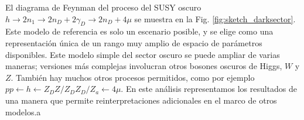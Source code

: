 El diagrama de Feynman del proceso del SUSY oscuro  $h \rightarrow 2n_1 \rightarrow 2n_D + 2\gamma_D \rightarrow 2n_D + 4\mu$ se muestra en la Fig. \ref{fig:sketch_darksector}. Este modelo de referencia es solo un escenario posible, y se elige como una representación única de un rango muy amplio de espacio de parámetros disponibles. Este modelo simple del sector oscuro se puede ampliar de varias maneras; versiones más complejas involucran otros bosones oscuros de Higgs, $W$ y $Z$. También hay muchos otros procesos permitidos, como por ejemplo $pp \leftarrow h \leftarrow Z_D Z / Z_D Z_D / Z_a \leftarrow 4\mu$. En este análisis representamos los resultados de una manera que permite reinterpretaciones adicionales en el marco de otros modelos.a




